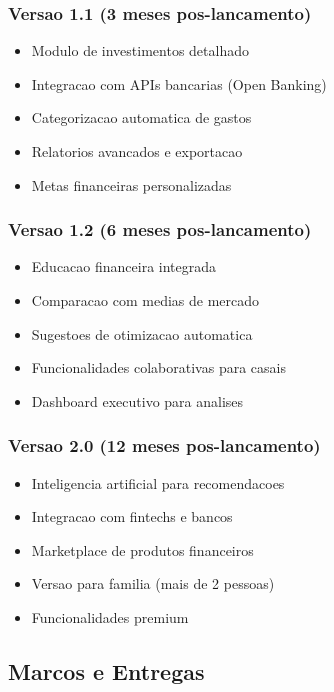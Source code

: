 \subsubsection{Versao 1.1 (3 meses pos-lancamento)}
\begin{itemize}
    \item Modulo de investimentos detalhado
    \item Integracao com APIs bancarias (Open Banking)
    \item Categorizacao automatica de gastos
    \item Relatorios avancados e exportacao
    \item Metas financeiras personalizadas
\end{itemize}

\subsubsection{Versao 1.2 (6 meses pos-lancamento)}
\begin{itemize}
    \item Educacao financeira integrada
    \item Comparacao com medias de mercado
    \item Sugestoes de otimizacao automatica
    \item Funcionalidades colaborativas para casais
    \item Dashboard executivo para analises
\end{itemize}

\subsubsection{Versao 2.0 (12 meses pos-lancamento)}
\begin{itemize}
    \item Inteligencia artificial para recomendacoes
    \item Integracao com fintechs e bancos
    \item Marketplace de produtos financeiros
    \item Versao para familia (mais de 2 pessoas)
    \item Funcionalidades premium
\end{itemize}

\subsection{Marcos e Entregas}


